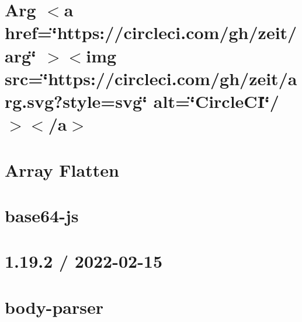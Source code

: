 \documentclass[twoside]{book}
\newcommand{\+}{\discretionary{\mbox{\scriptsize$\hookleftarrow$}}{}{}}
\begin{document}
\chapter{Arg \texorpdfstring{$<$}{<}a href=\char`\"{}https\+://circleci.\+com/gh/zeit/arg\char`\"{} \texorpdfstring{$>$}{>}\texorpdfstring{$<$}{<}img src=\char`\"{}https\+://circleci.\+com/gh/zeit/arg.\+svg?style=svg\char`\"{} alt=\char`\"{}\+Circle\+CI\char`\"{}/\texorpdfstring{$>$}{>}\texorpdfstring{$<$}{<}/a\texorpdfstring{$>$}{>}}
\label{md__c___users_vaishnavi_jadhav__desktop__developer_code_mean_stack_example_server_node_modules_arg__r_e_a_d_m_e}

\chapter{Array Flatten}
\label{md__c___users_vaishnavi_jadhav__desktop__developer_code_mean_stack_example_server_node_modules_array_flatten__r_e_a_d_m_e}

\chapter{base64-\/js}
\label{md__c___users_vaishnavi_jadhav__desktop__developer_code_mean_stack_example_server_node_modules_base64_js__r_e_a_d_m_e}

\chapter{1.19.2 / 2022-\/02-\/15}
\label{md__c___users_vaishnavi_jadhav__desktop__developer_code_mean_stack_example_server_node_modules_body_parser__h_i_s_t_o_r_y}

\chapter{body-\/parser}
\label{md__c___users_vaishnavi_jadhav__desktop__developer_code_mean_stack_example_server_node_modules_body_parser__r_e_a_d_m_e}

\end{document}
